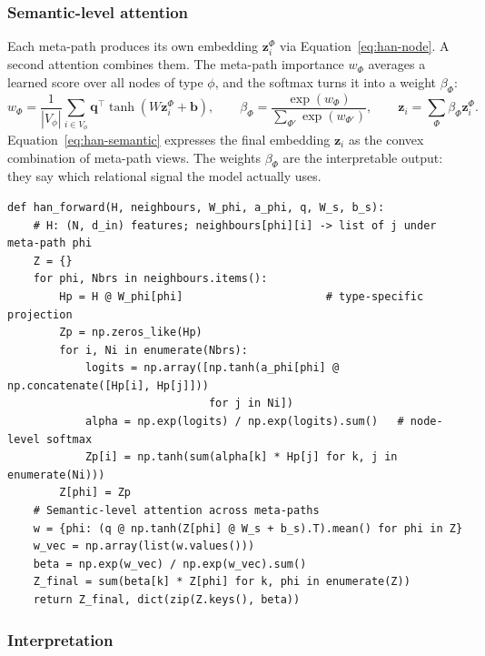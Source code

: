 \documentclass{article}
\begin{document}
\subsubsection*{Semantic-level attention}

Each meta-path produces its own embedding $\mathbf{z}^\Phi_i$ via Equation~\ref{eq:han-node}. A second attention combines them. The meta-path importance $w_\Phi$ averages a learned score over all nodes of type $\phi$, and the softmax turns it into a weight $\beta_\Phi$:
\begin{equation}
w_\Phi = \frac{1}{|V_\phi|} \sum_{i \in V_\phi} \mathbf{q}^\top \tanh(W \mathbf{z}^\Phi_i + \mathbf{b}), \qquad \beta_\Phi = \frac{\exp(w_\Phi)}{\sum_{\Phi'} \exp(w_{\Phi'})}, \qquad \mathbf{z}_i = \sum_\Phi \beta_\Phi \mathbf{z}^\Phi_i.
\label{eq:han-semantic}
\end{equation}
Equation~\ref{eq:han-semantic} expresses the final embedding $\mathbf{z}_i$ as the convex combination of meta-path views. The weights $\beta_\Phi$ are the interpretable output: they say which relational signal the model actually uses.

\begin{lstlisting}[caption={HAN node-level and semantic-level attention, implementing Equations~\ref{eq:han-node} and~\ref{eq:han-semantic} for one meta-path set.}]
def han_forward(H, neighbours, W_phi, a_phi, q, W_s, b_s):
    # H: (N, d_in) features; neighbours[phi][i] -> list of j under meta-path phi
    Z = {}
    for phi, Nbrs in neighbours.items():
        Hp = H @ W_phi[phi]                      # type-specific projection
        Zp = np.zeros_like(Hp)
        for i, Ni in enumerate(Nbrs):
            logits = np.array([np.tanh(a_phi[phi] @ np.concatenate([Hp[i], Hp[j]]))
                               for j in Ni])
            alpha = np.exp(logits) / np.exp(logits).sum()   # node-level softmax
            Zp[i] = np.tanh(sum(alpha[k] * Hp[j] for k, j in enumerate(Ni)))
        Z[phi] = Zp
    # Semantic-level attention across meta-paths
    w = {phi: (q @ np.tanh(Z[phi] @ W_s + b_s).T).mean() for phi in Z}
    w_vec = np.array(list(w.values()))
    beta = np.exp(w_vec) / np.exp(w_vec).sum()
    Z_final = sum(beta[k] * Z[phi] for k, phi in enumerate(Z))
    return Z_final, dict(zip(Z.keys(), beta))
\end{lstlisting}

\subsubsection*{Interpretation}
\end{document}
